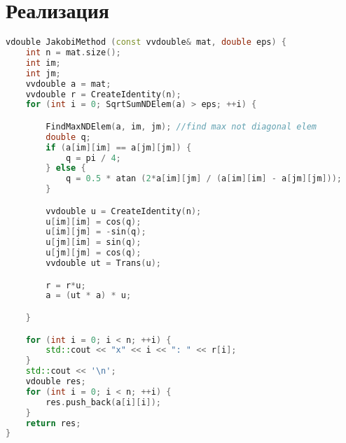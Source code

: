 \section*{Реализация}

\begin{lstlisting}[language=C++]
vdouble JakobiMethod (const vvdouble& mat, double eps) {
    int n = mat.size();
    int im;
    int jm;
    vvdouble a = mat;
    vvdouble r = CreateIdentity(n);
    for (int i = 0; SqrtSumNDElem(a) > eps; ++i) {

        FindMaxNDElem(a, im, jm); //find max not diagonal elem
        double q;
        if (a[im][im] == a[jm][jm]) {
            q = pi / 4;
        } else {
            q = 0.5 * atan (2*a[im][jm] / (a[im][im] - a[jm][jm]));
        }

        vvdouble u = CreateIdentity(n);
        u[im][im] = cos(q);
        u[im][jm] = -sin(q);
        u[jm][im] = sin(q);
        u[jm][jm] = cos(q);
        vvdouble ut = Trans(u);

        r = r*u;
        a = (ut * a) * u;

    }

    for (int i = 0; i < n; ++i) {
        std::cout << "x" << i << ": " << r[i];
    }
    std::cout << '\n';
    vdouble res;
    for (int i = 0; i < n; ++i) {
        res.push_back(a[i][i]);
    }
    return res;
}
\end{lstlisting}

\pagebreak
